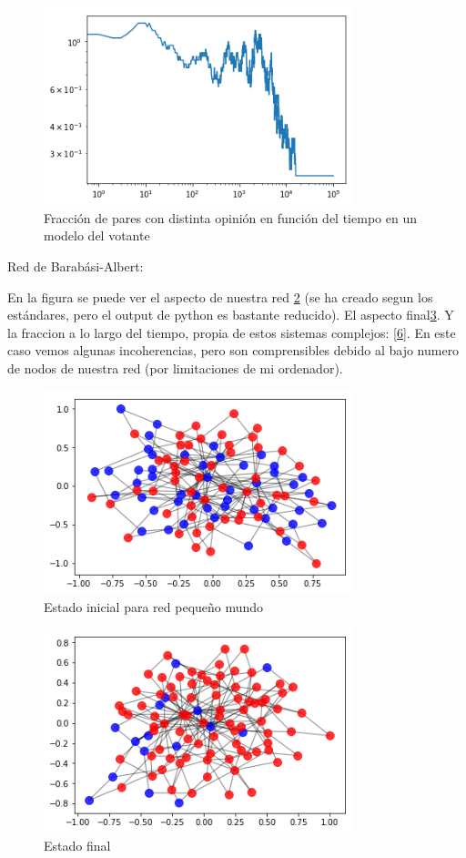 \begin{figure}
	\centering
	\includegraphics[width=9cm]{frac_small}
	\caption{Fracción de pares con distinta opinión en función del tiempo en un modelo del votante}
	\label{3}
\end{figure}

Red de Barabási-Albert:

En la figura se puede ver el aspecto de nuestra red \ref{4} (se ha creado segun los estándares, pero el output de python es bastante reducido). El aspecto final\ref{5}. Y la fraccion a lo largo del tiempo, propia de estos sistemas complejos: \ref{6}.
En este caso vemos algunas incoherencias, pero son comprensibles debido al bajo numero de nodos de nuestra red (por limitaciones de mi ordenador).
\begin{figure}
	\centering
	\includegraphics[width=9cm]{barra_inic}
	\caption{Estado inicial para red pequeño mundo}
	\label{4}
\end{figure}

\begin{figure}
	\centering
	\includegraphics[width=9cm]{barra_fin}
	\caption{Estado final}
	\label{5}
\end{figure}

